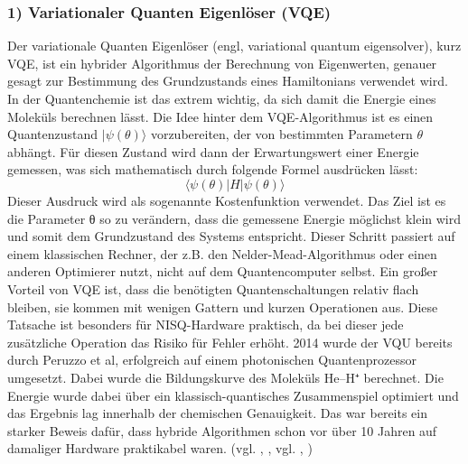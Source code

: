 \subsubsection*{1) Variationaler Quanten Eigenlöser (VQE)}
Der variationale Quanten Eigenlöser (engl, variational quantum eigensolver), kurz VQE, ist ein hybrider Algorithmus der Berechnung von Eigenwerten, genauer gesagt zur Bestimmung des Grundzustands eines Hamiltonians verwendet wird. In der Quantenchemie ist das extrem wichtig, da sich damit die Energie eines Moleküls berechnen lässt. Die Idee hinter dem VQE-Algorithmus ist es einen Quantenzustand $|\psi(\theta)\rangle$ vorzubereiten, der von bestimmten Parametern $\theta$ abhängt. Für diesen Zustand wird dann der Erwartungswert einer Energie gemessen, was sich mathematisch durch folgende Formel ausdrücken lässt:
$$
\langle\psi(\theta)|H|\psi(\theta)\rangle
$$
Dieser Ausdruck wird als sogenannte Kostenfunktion verwendet. Das Ziel ist es die Parameter θ so zu verändern, dass die gemessene Energie möglichst klein wird und somit dem Grundzustand des Systems entspricht. Dieser Schritt passiert auf einem klassischen Rechner, der z.B. den Nelder-Mead-Algorithmus oder einen anderen Optimierer nutzt, nicht auf dem Quantencomputer selbst. 
Ein großer Vorteil von VQE ist, dass die benötigten Quantenschaltungen relativ flach bleiben, sie kommen mit wenigen Gattern und kurzen Operationen aus. Diese Tatsache ist besonders für NISQ-Hardware praktisch, da bei dieser jede zusätzliche Operation das Risiko für Fehler erhöht. 
2014 wurde der VQU bereits durch Peruzzo et al, erfolgreich auf einem photonischen Quantenprozessor umgesetzt. Dabei wurde die Bildungskurve des Moleküls He–H⁺ berechnet. Die Energie wurde dabei über ein klassisch-quantisches Zusammenspiel optimiert und das Ergebnis lag innerhalb der chemischen Genauigkeit. Das war bereits ein starker Beweis dafür, dass hybride Algorithmen schon vor über 10 Jahren auf damaliger Hardware praktikabel waren. 
(vgl. \citeauthor{cerezo_variational_nodate}, \citeyear{cerezo_variational_nodate}, vgl. \citeauthor{peruzzo_variational_nodate}, \citeyear{peruzzo_variational_nodate})
